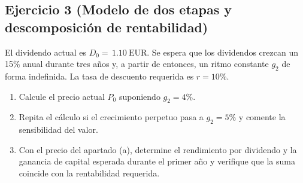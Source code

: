 \documentclass[12pt,a4paper]{article}
\newcommand{\EUR}[1]{\ensuremath{#1~\text{EUR}}}
\newenvironment{ejercicio}[1]{\subsection*{Ejercicio #1}}{}
\begin{document}
\begin{ejercicio}{3 (Modelo de dos etapas y descomposición de rentabilidad)}
El dividendo actual es $D_0=\,\EUR{1.10}$. Se espera que los dividendos crezcan un 15\% anual durante tres años y, a partir de entonces, un ritmo constante $g_2$ de forma indefinida. La tasa de descuento requerida es $r=10\%$.
\begin{enumerate}[label=\alph*)]
  \item Calcule el precio actual $P_0$ suponiendo $g_2=4\%$.
  \item Repita el cálculo si el crecimiento perpetuo pasa a $g_2=5\%$ y comente la sensibilidad del valor.
  \item Con el precio del apartado (a), determine el rendimiento por dividendo y la ganancia de capital esperada durante el primer año y verifique que la suma coincide con la rentabilidad requerida.
\end{enumerate}
\end{ejercicio}
\end{document}
